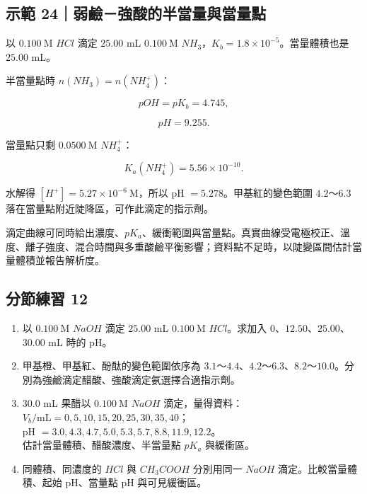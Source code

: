 \documentclass[11pt,a4paper]{article}
\providecommand{\tightlist}{%
  \setlength{\itemsep}{0pt}\setlength{\parskip}{0pt}}
\begin{document}
\begin{HandoutWorkedExample}

\subsection{示範 24｜弱鹼－強酸的半當量與當量點}\label{ux793aux7bc4-24ux5f31ux9e7cux5f37ux9178ux7684ux534aux7576ux91cfux8207ux7576ux91cfux9ede}

以 \(0.100\ \mathrm M\) \(HCl\) 滴定 \(25.00\) mL
\(0.100\ \mathrm M\) \(NH_3\)，\(K_b=1.8\times10^{-5}\)。當量體積也是 \(25.00\) mL。

半當量點時 \(n(NH_3)=n(NH_4^+)\)：

\[
pOH=pK_b=4.745,
\]

\[
pH=9.255.
\]

當量點只剩 \(0.0500\ \mathrm M\) \(NH_4^+\)：

\[
K_a(NH_4^+)=5.56\times10^{-10}.
\]

水解得 \([H^+]=5.27\times10^{-6}\ \mathrm M\)，所以 pH \(=5.278\)。甲基紅的變色範圍 \(4.2\)～\(6.3\) 落在當量點附近陡降區，可作此滴定的指示劑。

\end{HandoutWorkedExample}

滴定曲線可同時給出濃度、\(pK_a\)、緩衝範圍與當量點。真實曲線受電極校正、溫度、離子強度、混合時間與多重酸鹼平衡影響；資料點不足時，以陡變區間估計當量體積並報告解析度。

\subsection{分節練習 12}\label{ux5206ux7bc0ux7df4ux7fd2-12}

\begin{enumerate}
\def\labelenumi{\arabic{enumi}.}
\tightlist
\item
  以 \(0.100\ \mathrm M\) \(NaOH\) 滴定 \(25.00\) mL \(0.100\ \mathrm M\) \(HCl\)。求加入 \(0\)、\(12.50\)、\(25.00\)、\(30.00\) mL 時的 pH。
\item
  甲基橙、甲基紅、酚酞的變色範圍依序為 \(3.1\)～\(4.4\)、\(4.2\)～\(6.3\)、\(8.2\)～\(10.0\)。分別為強鹼滴定醋酸、強酸滴定氨選擇合適指示劑。
\item
  \(30.0\) mL 果醋以 \(0.100\ \mathrm M\) \(NaOH\) 滴定，量得資料：\\
  \(V_b/\mathrm{mL}=0,5,10,15,20,25,30,35,40\)；\\
  pH \(=3.0,4.3,4.7,5.0,5.3,5.7,8.8,11.9,12.2\)。\\
  估計當量體積、醋酸濃度、半當量點 \(pK_a\) 與緩衝區。
\item
  同體積、同濃度的 \(HCl\) 與 \(CH_3COOH\) 分別用同一 \(NaOH\) 滴定。比較當量體積、起始 pH、當量點 pH 與可見緩衝區。
\end{enumerate}
\end{document}
